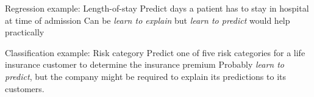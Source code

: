 \documentclass[11pt,compress,t,notes=noshow, xcolor=table]{beamer}
\begin{document}
\begin{framev}{Regression example: Length-of-stay}
Predict days a patient has to stay in hospital at time of admission
\vfill
{} %
\vfill
{}
\vfill
Can be \textit{learn to explain} but \textit{learn to predict} would help practically 
\end{framev}


\begin{framev}{Classification example: Risk category}
Predict one of five risk categories for a life insurance customer to determine the insurance premium 
\vfill
{} %
\vfill
{}
\vfill
Probably \textit{learn to predict}, but the company might be required to explain
its predictions to its customers.
\end{framev}

\endlecture
\end{document}
